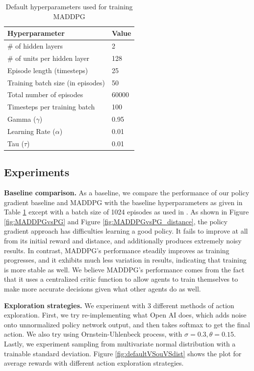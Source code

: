 \documentclass{article}
\begin{document}
\begin{table}[h!]
  \begin{center}
    
    \label{tab:basecase_parameters}
    \begin{tabular} {|l|l|} %
      \hline
      \textbf{Hyperparameter} & \textbf{Value} \\
      \hline
      \# of hidden layers & 2 \\
      \# of units per hidden layer & 128 \\
      Episode length (timesteps) & 25 \\
      Training batch size (in episodes) & 50 \\
      Total number of episodes & 60000 \\
			Timesteps per training batch & 100 \\
      Gamma ($\gamma$) & 0.95 \\
      Learning Rate ($\alpha$) & 0.01 \\
			Tau ($\tau$) & 0.01 \\
      \hline
    \end{tabular}
  \end{center}
	\caption{Default hyperparameters used for training MADDPG}
\end{table}

\subsection{Experiments}

\textbf{Baseline comparison.} As a baseline, we compare the performance of our policy gradient baseline and MADDPG with the baseline hyperparameters as given in Table \ref{tab:basecase_parameters} except with a batch size of 1024 episodes as used in \cite{maddpg}. As shown in Figure \ref{fig:MADDPGvsPG} and Figure \ref{fig:MADDPGvsPG_distance}, the policy gradient approach has difficulties learning a good policy. It fails to improve at all from its initial reward and distance, and additionally produces extremely noisy results. In contrast, MADDPG's performance steadily improves as training progresses, and it exhibits much less variation in results, indicating that training is more stable as well. We believe MADDPG's performance comes from the fact that it uses a centralized critic function to allow agents to train themselves to make more accurate decisions given what other agents do as well.

\textbf{Exploration strategies.} We experiment with 3 different methods of action exploration. First, we try re-implementing what Open AI does, which adds noise onto unnormalized policy network output, and then takes softmax to get the final action. We also try using Ornstein-Uhlenbeck process, with $\sigma = 0.3, \theta = 0.15$. Lastly, we experiment sampling from multivariate normal distribution with a trainable standard deviation. Figure \ref{fig:defaultVSouVSdist} shows the plot for average rewards with different action exploration strategies.
\end{document}
